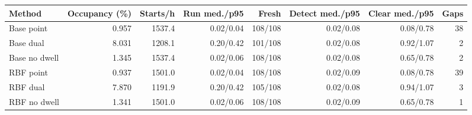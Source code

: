 \begin{tabular}{lrrrrrrr}\toprule
Method & Occupancy (\%) & Starts/h & Run med./p95 & Fresh & Detect med./p95 & Clear med./p95 & Gaps\\\midrule
Base point & 0.957 & 1537.4 & 0.02/0.04 & 108/108 & 0.02/0.08 & 0.08/0.78 & 38 \\
Base dual & 8.031 & 1208.1 & 0.20/0.42 & 101/108 & 0.02/0.08 & 0.92/1.07 & 2 \\
Base no dwell & 1.345 & 1537.4 & 0.02/0.06 & 108/108 & 0.02/0.08 & 0.65/0.78 & 2 \\
RBF point & 0.937 & 1501.0 & 0.02/0.04 & 108/108 & 0.02/0.09 & 0.08/0.78 & 39 \\
RBF dual & 7.870 & 1191.9 & 0.20/0.42 & 105/108 & 0.02/0.08 & 0.94/1.07 & 3 \\
RBF no dwell & 1.341 & 1501.0 & 0.02/0.06 & 108/108 & 0.02/0.09 & 0.65/0.78 & 1 \\
\bottomrule\end{tabular}
